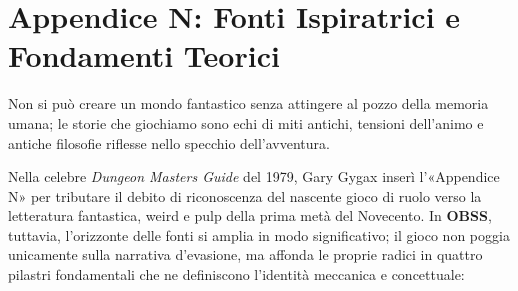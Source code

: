 

\pagebreak

\section*{Appendice N: Fonti Ispiratrici e Fondamenti Teorici}\label{appendice-n}

\begin{enfasi}{
Non si può creare un mondo fantastico senza attingere al pozzo della memoria umana; le storie che giochiamo sono echi di miti antichi, tensioni dell'animo e antiche filosofie riflesse nello specchio dell'avventura.
}\end{enfasi}

\medskip

Nella celebre \emph{Dungeon Masters Guide} del 1979, Gary Gygax inserì l'«Appendice N» per tributare il debito di riconoscenza del nascente gioco di ruolo verso la letteratura fantastica, weird e pulp della prima metà del Novecento. In \textbf{OBSS}, tuttavia, l'orizzonte delle fonti si amplia in modo significativo; il gioco non poggia unicamente sulla narrativa d'evasione, ma affonda le proprie radici in quattro pilastri fondamentali che ne definiscono l'identità meccanica e concettuale:

